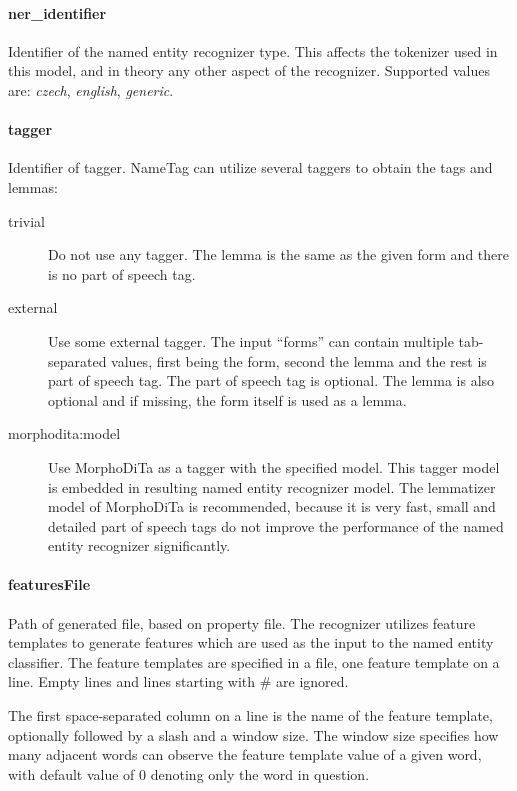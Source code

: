 \paragraph{ner\_identifier}
Identifier of the named entity recognizer type. This affects the tokenizer used
in this model, and in theory any other aspect of the recognizer. Supported values
are: \emph{czech}, \emph{english}, \emph{generic}.

\paragraph{tagger}
Identifier of tagger. NameTag can utilize several taggers to obtain the tags and lemmas:

\begin{description}
\item[trivial]
Do not use any tagger. The lemma is the same as the given form and there is no
part of speech tag.
\item[external]
Use some external tagger. The input ``forms'' can contain multiple tab-separated
values, first being the form, second the lemma and the rest is part of speech tag.
The part of speech tag is optional. The lemma is also optional and if missing,
the form itself is used as a lemma.
\item[morphodita:model]
Use MorphoDiTa as a tagger with the specified model. This tagger model is embedded
in resulting named entity recognizer model. The lemmatizer model of MorphoDiTa
is recommended, because it is very fast, small and detailed part of speech tags
do not improve the performance of the named entity recognizer significantly.
\end{description}

\paragraph{featuresFile}
Path of generated file, based on property file.
The recognizer utilizes feature templates to generate features which are used as
the input to the named entity classifier. The feature templates are specified in
a file, one feature template on a line. Empty lines and lines starting with \# are ignored.

The first space-separated column on a line is the name of the feature template,
optionally followed by a slash and a window size. The window size specifies how
many adjacent words can observe the feature template value of a given word, with
default value of 0 denoting only the word in question.

